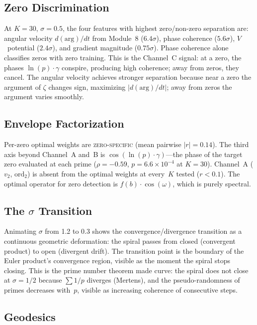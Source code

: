 \documentclass[11pt]{amsart}
\begin{document}
\subsection{Zero Discrimination}

At $K=30$, $\sigma=0.5$, the four features with highest zero/non-zero
separation are: angular velocity $d(\mathrm{arg})/dt$ from Module~8
($6.4\sigma$), phase coherence ($5.6\sigma$), $V$~potential ($2.4\sigma$),
and gradient magnitude ($0.75\sigma$). Phase coherence alone classifies zeros
with zero training. This is the Channel~C signal: at a zero, the phases
$\ln(p)\cdot\gamma$ conspire, producing high coherence; away from zeros, they
cancel. The angular velocity achieves stronger separation because near a zero
the argument of $\zeta$ changes sign, maximizing $|d(\mathrm{arg})/dt|$;
away from zeros the argument varies smoothly.

\subsection{Envelope Factorization}

Per-zero optimal weights are \textsc{zero-specific} (mean pairwise
$|r| = 0.14$). The third axis beyond Channel~A and~B is
$\cos(\ln(p)\cdot\gamma)$---the phase of the target zero evaluated at each
prime ($\rho = -0.59$, $p = 6.6\times 10^{-4}$ at $K=30$). Channel~A ($v_2$,
$\mathrm{ord}_2$) is absent from the optimal weights at every~$K$ tested
($r < 0.1$). The optimal operator for zero detection is $f(b)\cdot\cos(\omega)$,
which is purely spectral.

\subsection{The $\sigma$ Transition}

Animating $\sigma$ from 1.2 to 0.3 shows the convergence/divergence
transition as a continuous geometric deformation: the spiral passes from
closed (convergent product) to open (divergent drift). The transition point
is the boundary of the Euler product's convergence region, visible as the
moment the spiral stops closing. This is the prime number theorem made curve:
the spiral does not close at $\sigma = 1/2$ because $\sum 1/p$ diverges
(Mertens), and the pseudo-randomness of primes decreases with~$p$, visible
as increasing coherence of consecutive steps.

\subsection{Geodesics}
\end{document}
